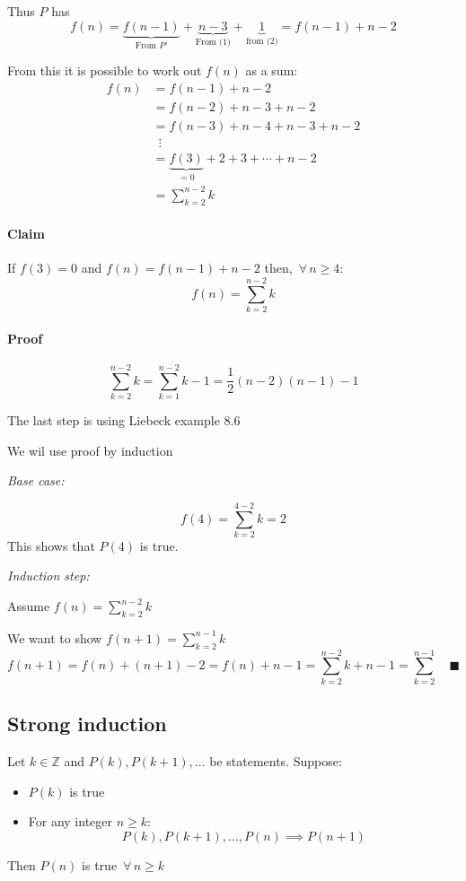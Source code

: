\documentclass{article}
\newcommand{\bb}[1]{\mathbb{#1}}
\newcommand{\A}{\,\forall\,}
\newcounter{example}[section]
\begin{document}
Thus \(P\) has 
\[f(n)=\underbrace{f(n-1)}_{\text{From }P'}+\underbrace{n-3}_{\text{From (1)}}+\underbrace{1}_{\text{from (2)}}=f(n-1)+n-2\]

From this it is possible to work out \(f(n)\) as a sum:
\begin{align*}
f(n)&=f(n-1)+n-2\\
&=f(n-2)+n-3+n-2\\
&=f(n-3)+n-4+n-3+n-2\\
&\,\,\,\vdots\\
&=\underbrace{f(3)}_{=0}+2+3+\dotsb+n-2\\
&=\sum_{k=2}^{n-2}k
\end{align*}

\paragraph{Claim} If \(f(3)=0\) and \(f(n)=f(n-1)+n-2\) then, \(\A n\ge 4\):
\[f(n)=\sum_{k=2}^{n-2}k\]

\paragraph{Proof} 

\[\sum_{k=2}^{n-2}k=\sum_{k=1}^{n-2}k-1=\frac 12(n-2)(n-1)-1\]

The last step is using Liebeck example 8.6

We wil use proof by induction

\emph{Base case:}

\[f(4)=\sum_{k=2}^{4-2}k=2\]
This shows that \(P(4)\) is true.

\emph{Induction step:}

Assume \(\displaystyle{f(n)=\sum_{k=2}^{n-2}k}\)

We want to show \(\displaystyle{f(n+1)=\sum_{k=2}^{n-1}k}\)
\[f(n+1)=f(n)+(n+1)-2=f(n)+n-1=\sum_{k=2}^{n-2}k+n-1=\sum_{k=2}^{n-1}\quad\blacksquare\]

\subsection*{Strong induction}

Let \(k\in\bb Z\) and \(P(k),P(k+1),\dotsc\) be statements. Suppose:
\begin{itemize}
\item \(P(k)\) is true
\item For any integer \(n\ge k\):
\[P(k),P(k+1),\dotsc,P(n)\implies P(n+1)\] 
\end{itemize}
Then \(P(n)\) is true \(\A n\ge k\)
\end{document}
